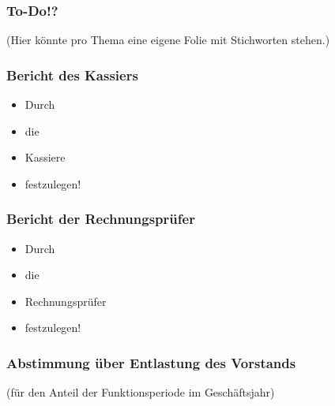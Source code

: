 \documentclass[17pt]{beamer}
\begin{document}
\begin{frame}
	\frametitle{To-Do!?}
	(Hier könnte pro Thema eine eigene Folie mit Stichworten stehen.)
\end{frame}



\begin{frame}
	\frametitle{Bericht des Kassiers}
	\begin{itemize}
		\item Durch
		\item die
		\item Kassiere
		\item festzulegen!
	\end{itemize}
\end{frame}



\begin{frame}
	\frametitle{Bericht der Rechnungsprüfer}
	\begin{itemize}
		\item Durch
		\item die
		\item Rechnungsprüfer
		\item festzulegen!
	\end{itemize}
\end{frame}



\begin{frame}
	\frametitle{Abstimmung über Entlastung des Vorstands}
	(für den Anteil der Funktionsperiode im Geschäftsjahr)
\end{frame}
\end{document}
